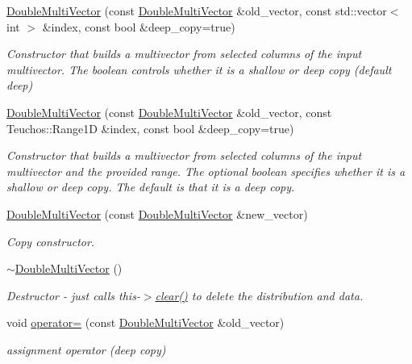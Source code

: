 \begin{DoxyCompactItemize}
\hyperlink{classoomph_1_1DoubleMultiVector_a38d29d498100228299b29f1dc46b4251}{Double\+Multi\+Vector} (const \hyperlink{classoomph_1_1DoubleMultiVector}{Double\+Multi\+Vector} \&old\+\_\+vector, const std\+::vector$<$ int $>$ \&index, const bool \&deep\+\_\+copy=true)
\begin{DoxyCompactList}\small\item\em Constructor that builds a multivector from selected columns of the input multivector. The boolean controls whether it is a shallow or deep copy (default deep) \end{DoxyCompactList}\item 
\hyperlink{classoomph_1_1DoubleMultiVector_a7dec1c0b074c260ee22207cdfed20eca}{Double\+Multi\+Vector} (const \hyperlink{classoomph_1_1DoubleMultiVector}{Double\+Multi\+Vector} \&old\+\_\+vector, const Teuchos\+::\+Range1D \&index, const bool \&deep\+\_\+copy=true)
\begin{DoxyCompactList}\small\item\em Constructor that builds a multivector from selected columns of the input multivector and the provided range. The optional boolean specifies whether it is a shallow or deep copy. The default is that it is a deep copy. \end{DoxyCompactList}\item 
\hyperlink{classoomph_1_1DoubleMultiVector_af9eb30b7fa130f8d6211b8f63c962e68}{Double\+Multi\+Vector} (const \hyperlink{classoomph_1_1DoubleMultiVector}{Double\+Multi\+Vector} \&new\+\_\+vector)
\begin{DoxyCompactList}\small\item\em Copy constructor. \end{DoxyCompactList}\item 
\hyperlink{classoomph_1_1DoubleMultiVector_a551268cff3ee84866a102db6fb1fd6b0}{$\sim$\+Double\+Multi\+Vector} ()
\begin{DoxyCompactList}\small\item\em Destructor -\/ just calls this-\/$>$\hyperlink{classoomph_1_1DoubleMultiVector_a6e4ab708964cd1dce2d47ea2c0fc91df}{clear()} to delete the distribution and data. \end{DoxyCompactList}\item 
void \hyperlink{classoomph_1_1DoubleMultiVector_a7f48a5a0d0330bd6ee2f9b0ac1c5fa08}{operator=} (const \hyperlink{classoomph_1_1DoubleMultiVector}{Double\+Multi\+Vector} \&old\+\_\+vector)
\begin{DoxyCompactList}\small\item\em assignment operator (deep copy) \end{DoxyCompactList}\item 

\end{DoxyCompactItemize}
